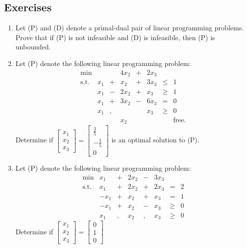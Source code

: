 \subsection*{Exercises}\label{exercises-7}

\begin{enumerate}
\def\labelenumi{\arabic{enumi}.}
\item
  Let (P) and (D) denote a primal-dual pair of linear programming
  problems. Prove that if (P) is not infeasible and (D) is infeasible,
  then (P) is unbounded.
\item
  Let (P) denote the following linear programming problem:
  \[\begin{array}{rrcrcrll}
  \min & &  & 4x_2  & + & 2x_3  \\
  \text{s.t.} 
   & x_1 & + &  x_2 & + & 3x_3  & \leq & 1  \\
   & x_1 & - & 2x_2 & + &  x_3  & \geq & 1  \\
   & x_1 & + & 3x_2 & - & 6x_3  & = & 0  \\
   & x_1 & , &     &    & x_3  & \geq & 0 \\
   &     &   & x_2  &   &      &    & \text{free.}
  \end{array}\] Determine if
  \(\begin{bmatrix} x_1\\x_2\\x_3 \end{bmatrix} =\begin{bmatrix} \frac{3}{5} \\ -\frac{1}{5}\\ 0 \end{bmatrix}\)
  is an optimal solution to (P).
\item
  Let (P) denote the following linear programming problem:
  \[\begin{array}{rrcrcrlll}
  \min & x_1 & + & 2x_2  & - & 3x_3  \\
  \text{s.t.} 
  &  x_1 & + & 2 x_2 & + & 2x_3  & = & 2  \\
  &  -x_1 & + &  x_2 & + & x_3  & = & 1  \\
  &  -x_1 & + & x_2 & - & x_3  & \geq & 0  \\
  &  x_1 & , & x_2 & , & x_3  & \geq & 0 
  \end{array}\] Determine if
  \(\begin{bmatrix} x_1\\x_2\\x_3 \end{bmatrix} =\begin{bmatrix} 0 \\ 1\\ 0 \end{bmatrix}\)

\end{enumerate}
